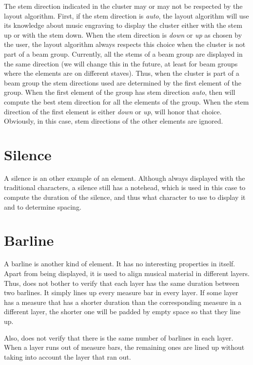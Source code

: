 The stem direction indicated in the cluster may or may not be
respected by the layout algorithm.  First, if the stem direction is
\emph{auto}, the layout algorithm will use its knowledge about music
engraving to display the cluster either with the stem up or with the
stem down.  When the stem direction is \emph{down} or \emph{up} as
chosen by the user, the layout algorithm always respects this choice
when the cluster is not part of a beam group.  Currently, all the
stems of a beam group are displayed in the same direction (we will
change this in the future, at least for beam groups where the elements
are on different staves).  Thus, when the cluster is part of a beam
group the stem directions used are determined by the first element of
the group.  When the first element of the group has stem direction
\emph{auto}, then \sysname{} will compute the best stem direction for all
the elements of the group.  When the stem direction of the first
element is either \emph{down} or \emph{up}, \sysname{} will honor that
choice.  Obviously, in this case, stem directions of the other
elements are ignored. 

\section{Silence}

A silence is an other example of an element.  Although always
displayed with the traditional characters, a silence still has a
notehead, which is used in this case to compute the duration of the
silence, and thus what character to use to display it and to determine
spacing. 

\section{Barline}

A barline is another kind of element.  It has no interesting
properties in itself.  Apart from being displayed, it is used to align
musical material in different layers.  Thus, \sysname{} does not bother to
verify that each layer has the same duration between two barlines.
It simply lines up every measure bar in every layer.  If some
layer has a measure that has a shorter duration than the corresponding
measure in a different layer, the shorter one will be padded by empty
space so that they line up. 

Also, \sysname{} does not verify that there is the same number of barlines
in each layer.  When a layer runs out of measure bars, the remaining
ones are lined up without taking into account the layer that ran out.
